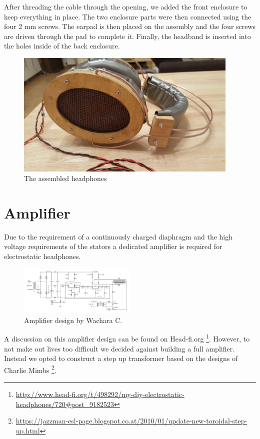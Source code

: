 \documentclass{article}
\begin{document}
After threading the cable through the opening, we added the front enclosure to keep everything in place. The two enclosure parts were then connected using the four 2 mm screws. The earpad is then placed on the assembly and the four screws are driven through the pad to complete it. Finally, the headband is inserted into the holes inside of the back enclosure.

\begin{figure}[htb]
    \centering
    \includegraphics[width=0.95\textwidth]{images/headphones_side.jpg}
    \caption{The assembled headphones}
    \label{f:assembly:phones}
\end{figure}

\section{Amplifier}
\label{s:amp}
Due to the requirement of a continuously charged diaphragm and the high voltage requirements of the stators a dedicated amplifier is required for electrostatic headphones.
\begin{figure}[htb]
    \centering
    \includegraphics[width=0.5\textwidth]{images/wachara-amp.png}
    \caption{Amplifier design by Wachara C.}
    \label{f:amp:wachara}
\end{figure}
A discussion on this amplifier design can be found on Head-fi.org \footnote{\url{http://www.head-fi.org/t/498292/my-diy-electrostatic-headphones/720#post_9182523}}. However, to not make out lives too difficult we decided against building a full amplifier. Instead we opted to construct a step up transformer based on the designs of Charlie Mimbs \footnote{\url{https://jazzman-esl-page.blogspot.co.at/2010/01/update-new-toroidal-step-up.html}}.
\end{document}
